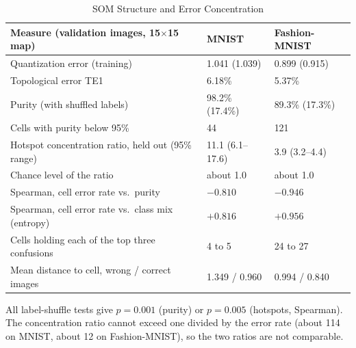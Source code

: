 \documentclass{scrartcl}
\begin{document}
\begin{table}[H]
\centering
\caption{SOM Structure and Error Concentration}
\label{tab:som}
\renewcommand{\arraystretch}{1.12}
\small
\begin{tabular}{|L{0.50\textwidth}|C{0.18\textwidth}|C{0.18\textwidth}|}
\hline
\textbf{Measure (validation images, 15$\times$15 map)} & \textbf{MNIST} & \textbf{Fashion-MNIST} \\ \hline
Quantization error (training) & 1.041 (1.039) & 0.899 (0.915) \\ \hline
Topological error TE1 & 6.18\% & 5.37\% \\ \hline
Purity (with shuffled labels) & 98.2\% (17.4\%) & 89.3\% (17.3\%) \\ \hline
Cells with purity below 95\% & 44 & 121 \\ \hline
Hotspot concentration ratio, held out (95\% range) & 11.1 (6.1--17.6) & 3.9 (3.2--4.4) \\ \hline
Chance level of the ratio & about 1.0 & about 1.0 \\ \hline
Spearman, cell error rate vs.\ purity & $-0.810$ & $-0.946$ \\ \hline
Spearman, cell error rate vs.\ class mix (entropy) & $+0.816$ & $+0.956$ \\ \hline
Cells holding each of the top three confusions & 4 to 5 & 24 to 27 \\ \hline
Mean distance to cell, wrong / correct images & 1.349 / 0.960 & 0.994 / 0.840 \\ \hline
\end{tabular}

\par\vspace{3pt}
{\footnotesize\raggedright\noindent All label-shuffle tests give $p=0.001$ (purity) or $p=0.005$ (hotspots, Spearman). The concentration ratio cannot exceed one divided by the error rate (about 114 on MNIST, about 12 on Fashion-MNIST), so the two ratios are not comparable.\par}
\end{table}
\end{document}
